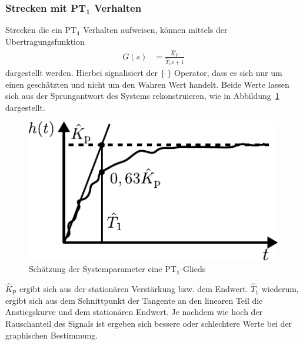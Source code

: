\subsubsection{Strecken mit PT$_{\boldsymbol{1}}$ Verhalten}
%
Strecken die ein PT$_{\boldsymbol{1}}$ Verhalten aufweisen, können mittels der Übertragungsfunktion
%
\begin{equation*}
\begin{aligned}
%
G(s)&=\frac{\hat{K}_{\text{P}}}{\hat{T}_{1}s+1}%
%
\end{aligned}
\end{equation*}
%
dargestellt werden. Hierbei signalisiert der $\{\,\hat{}\,\}$ Operator, dass es sich nur um einen geschätzten und nicht um den Wahren Wert handelt. Beide Werte lassen sich aus der Sprungantwort des Systems rekonstruieren, wie in Abbildung~\ref{fig:experimpt1} dargestellt.
%
\begin{figure}[h]
	\centering
	\includegraphics[width=0.45\linewidth]{Abbildungen/Modellbildung/PDF/ExperimentelPT1.pdf}
	\caption{Schätzung der Systemparameter eine PT$_{\boldsymbol{1}}$-Glieds \cite{Foellinger94}}
	\label{fig:experimpt1}
\end{figure}
%
$\hat{K}_{\text{P}}$ ergibt sich aus der stationären Verstärkung bzw. dem Endwert. $\hat{T}_{\text{1}}$ wiederum, ergibt sich aus dem Schnittpunkt der Tangente an den linearen Teil die Anstiegskurve und dem stationären Endwert. Je nachdem wie hoch der Rauschanteil des Signals ist ergeben sich bessere oder schlechtere Werte bei der graphischen Bestimmung.
%
